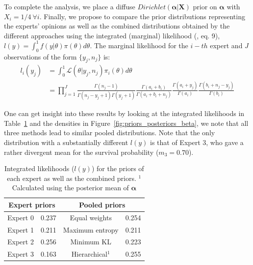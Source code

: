 \documentclass[a4paper, notitlepage, 10pt]{article}
\begin{document}

To complete the analysis, we place a diffuse $Dirichlet(\boldsymbol\alpha | \boldsymbol X)$ prior on $\boldsymbol\alpha$ with $X_i = 1/4 \: \forall i$.
Finally, we propose to compare the prior distributions representing the experts' opinions as well as the combined distributions obtained by the different approaches using the integrated (marginal) likelihood (\cite{raftery2007}, eq. 9), $l(y) = \int_{0}^{1}f(y|\theta)\pi(\theta)d\theta$.
The marginal likelihood for the $i-th$ expert and $J$ observations of the form $\{ y_j, n_j\}$ is:
\begin{align}
  \label{eq:marglike}
l_i(y_j) &= \int_{0}^{1}\mathcal{L}(\theta|y_j, n_j)\pi_i(\theta)d\theta\nonumber\\
 &= \prod_{j = 1}^{J}\frac{\Gamma(n_j-1)}{\Gamma(n_j-y_j + 1)\Gamma(y_j+1)}\frac{\Gamma(a_i + b_i)}{\Gamma(a_i + b_i + n_j)}\frac{\Gamma(a_i + y_j)}{\Gamma(a_i)}\frac{\Gamma(b_i + n_j - y_j) }{\Gamma(b_i)}
 \end{align}


One can get insight into these results by looking at the integrated likelihoods in Table~\ref{tab:marglikes} and the densities in Figure~\ref{fig:priors_posteriors_beta}, we note that all three methods lead  to similar pooled distributions.
Note that the only distribution with a substantially different $l(y)$ is that of Expert 3, who gave a rather divergent mean for the survival probability ($m_3=0.70$).

\begin{table}[ht]
\caption{Integrated likelihoods ($l(y)$) for the priors of each expert as well as the combined priors.
$^1$ Calculated using the posterior mean of $\boldsymbol\alpha$}
\centering
\begin{tabular}{cccc}
   \hline
   \multicolumn{2}{c}{Expert priors} &  \multicolumn{2}{c}{Pooled priors} \\
   \hline
   Expert 0 & 0.237 & Equal weights & 0.254\\
   Expert 1 & 0.211 & Maximum entropy & 0.211 \\
   Expert 2 & 0.256 & Minimum KL & 0.223\\ 
   Expert 3 & 0.163 & Hierarchical$^1$ & 0.255 \\
   \hline
\end{tabular}
\label{tab:marglikes}
\end{table}
\end{document}
